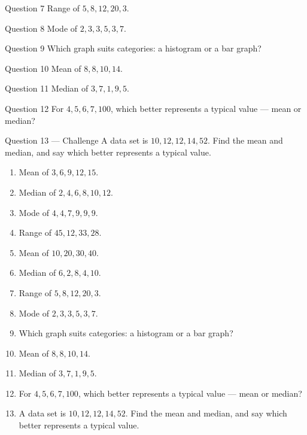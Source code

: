 \documentclass[11pt]{article}
\begin{document}
\begin{qbox}{Question 7}
Range of $5, 8, 12, 20, 3$.\workspace{2.4cm}
\end{qbox}

\begin{qbox}{Question 8}
Mode of $2, 3, 3, 5, 3, 7$.\workspace{2.4cm}
\end{qbox}

\begin{qbox}{Question 9}
Which graph suits categories: a histogram or a bar graph?\workspace{2.4cm}
\end{qbox}

\begin{qbox}{Question 10}
Mean of $8, 8, 10, 14$.\workspace{2.4cm}
\end{qbox}

\begin{qbox}{Question 11}
Median of $3, 7, 1, 9, 5$.\workspace{2.4cm}
\end{qbox}

\begin{qbox}{Question 12}
For $4, 5, 6, 7, 100$, which better represents a typical value — mean or median?\workspace{2.4cm}
\end{qbox}

\begin{qbox}{Question 13 --- Challenge}
A data set is $10, 12, 12, 14, 52$. Find the mean and median, and say which better represents a typical value.\workspace{3cm}
\end{qbox}

\clearpage
{}

\begin{recapbox}
\begin{multicols}{2}
\small
\begin{enumerate}[leftmargin=*,itemsep=3pt]
  \item Mean of $3, 6, 9, 12, 15$.
  \item Median of $2, 4, 6, 8, 10, 12$.
  \item Mode of $4, 4, 7, 9, 9, 9$.
  \item Range of $45, 12, 33, 28$.
  \item Mean of $10, 20, 30, 40$.
  \item Median of $6, 2, 8, 4, 10$.
  \item Range of $5, 8, 12, 20, 3$.
  \item Mode of $2, 3, 3, 5, 3, 7$.
  \item Which graph suits categories: a histogram or a bar graph?
  \item Mean of $8, 8, 10, 14$.
  \item Median of $3, 7, 1, 9, 5$.
  \item For $4, 5, 6, 7, 100$, which better represents a typical value — mean or median?
  \item A data set is $10, 12, 12, 14, 52$. Find the mean and median, and say which better represents a typical value.
\end{enumerate}
\end{multicols}
\end{recapbox}
\end{document}
